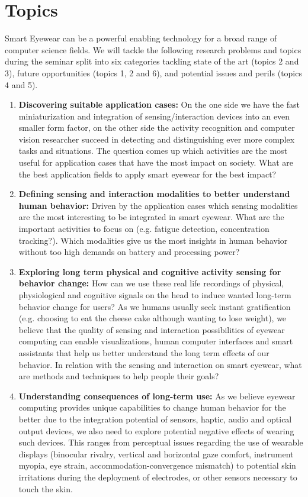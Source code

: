 \documentclass{sigchi-ext}
\begin{document}
\section{Topics}
Smart Eyewear can be a powerful enabling technology for a broad range of computer science fields. We will tackle the following research problems and topics during the seminar split into six categories tackling state of the art (topics 2 and 3), future opportunities (topics 1, 2 and 6), and potential issues and perils (topics 4 and 5).
\begin{enumerate}
  \item {\bf Discovering suitable application cases:} On the one side we have the fast miniaturization and integration of sensing/interaction devices into an even smaller form factor, on the other side the activity recognition  and computer vision researcher succeed in detecting and distinguishing ever more complex tasks and situations. The question comes up which activities are the most useful for application cases that have the most impact on society. What are the best application fields to apply smart eyewear for the best impact?
  \item {\bf Defining sensing and interaction modalities to better understand human behavior:} Driven by the application cases which sensing modalities are the most interesting to be integrated in smart eyewear. What are the important activities to focus on (e.g. fatigue detection, concentration tracking?). Which modalities give us the most insights in human behavior without too high demands on battery and processing power? 
  \item {\bf Exploring long term physical and cognitive activity sensing for behavior change:} How can we use these real life recordings of physical, physiological and cognitive signals on the head to induce wanted long-term behavior change for users? As we humans usually seek instant gratification (e.g. choosing to eat the cheese cake although wanting to lose weight), we believe that the quality of sensing and interaction possibilities of eyewear computing can enable visualizations, human computer interfaces and smart assistants that help us better understand the long term effects of our behavior. In relation with the sensing and interaction on smart eyewear, what are methods and techniques to help people their goals?
  \item {\bf Understanding consequences of long-term use:} As we believe eyewear computing provides unique capabilities to change human behavior for the better due to the integration potential of sensors, haptic, audio and optical output devices, we also need to explore potential negative effects of wearing such devices. This ranges from perceptual issues regarding the use of wearable displays (binocular rivalry, vertical and horizontal gaze comfort, instrument myopia, eye strain, accommodation-convergence mismatch) to potential skin irritations during the deployment of electrodes, or other sensors necessary to touch the skin. 

\end{enumerate}
\end{document}
